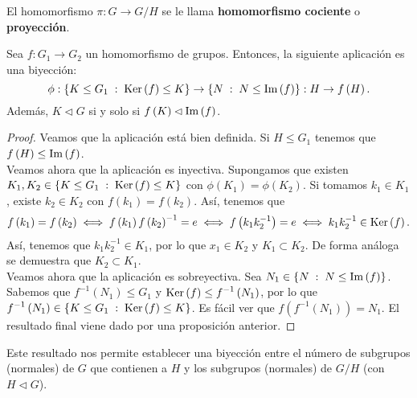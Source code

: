 \begin{observation}
El homomorfismo $\displaystyle \pi : G \to G/H $ se le llama \textbf{homomorfismo cociente} o \textbf{proyección}. 
\end{observation}
\begin{prop}
Sea $\displaystyle f: G_{1} \to G_{2} $ un homomorfismo de grupos. Entonces, la siguiente aplicación es una biyección:
\[\phi : \left\{ K \leq G_{1} \; : \; \operatorname{Ker}\left(f\right) \leq K\right\} \to \left\{ N \; : \; N \leq \operatorname{Im}\left(f\right)\right\} : H \to f\left(H\right)  .\]
Además, $\displaystyle K \lhd G $ si y solo si $\displaystyle f\left(K\right) \lhd \operatorname{Im}\left(f\right) $.
\end{prop}
\begin{proof}
	Veamos que la aplicación está bien definida. Si $\displaystyle H \leq G_{1} $ tenemos que $\displaystyle f\left(H\right) \leq \operatorname{Im}\left(f\right) $. \\
	Veamos ahora que la aplicación es inyectiva. Supongamos que existen $\displaystyle K_{1}, K_{2} \in \left\{ K \leq G_{1} \; : \; \operatorname{Ker}\left(f\right) \leq K\right\}  $ con $\displaystyle \phi\left(K_{1}\right) = \phi\left(K_{2}\right) $. Si tomamos $\displaystyle k_{1} \in K_{1} $, existe $\displaystyle k_{2} \in K_{2} $ con $\displaystyle f\left(k_{1}\right) = f\left(k_{2}\right) $. 
Así, tenemos que
\[f\left(k_{1}\right) = f\left(k_{2}\right) \iff f\left(k_{1}\right)f\left(k_{2}\right)^{-1} = e \iff f\left(k_{1}k_{2}^{-1}\right) = e \iff k_{1}k_{2}^{-1} \in \operatorname{Ker}\left(f\right)  .\]
Así, tenemos que $\displaystyle k_{1}k_{2}^{-1} \in K_{1} $, por lo que $\displaystyle x_{1} \in K_{2} $ y $\displaystyle K_{1} \subset K_{2} $. De forma análoga se demuestra que $\displaystyle K_{2} \subset K_{1} $. \\
Veamos ahora que la aplicación es sobreyectiva. Sea $\displaystyle N_{1} \in \left\{ N \; : \; N \leq \operatorname{Im}\left(f\right)\right\}  $. Sabemos que $\displaystyle f^{-1}\left(N_{1}\right) \leq G_{1} $ y $\displaystyle \operatorname{Ker}\left(f\right) \leq f^{-1}\left(N_{1}\right) $, por lo que $\displaystyle f^{-1}\left(N_{1}\right) \in \left\{ K \leq G_{1} \; : \; \operatorname{Ker}\left(f\right) \leq K\right\}  $. Es fácil ver que $\displaystyle f\left(f^{-1}\left(N_{1}\right)\right) = N_{1} $. El resultado final viene dado por una proposición anterior.  
\end{proof}
\begin{observation}
Este resultado nos permite establecer una biyección entre el número de subgrupos (normales) de $\displaystyle G $ que contienen a $\displaystyle H $ y los subgrupos (normales) de $\displaystyle G/H $ (con $\displaystyle H \lhd G $). 
\end{observation}
